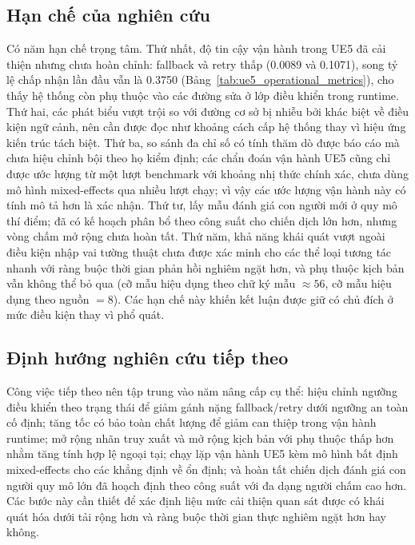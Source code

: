 ﻿\documentclass[a4paper,12pt]{article}
\begin{document}
\subsection{Hạn chế của nghiên cứu}
Có năm hạn chế trọng tâm. Thứ nhất, độ tin cậy vận hành trong UE5 đã cải thiện nhưng chưa hoàn chỉnh: fallback và retry thấp (0.0089 và 0.1071), song tỷ lệ chấp nhận lần đầu vẫn là 0.3750 (Bảng~\ref{tab:ue5_operational_metrics}), cho thấy hệ thống còn phụ thuộc vào các đường sửa ở lớp điều khiển trong runtime. Thứ hai, các phát biểu vượt trội so với đường cơ sở bị nhiễu bởi khác biệt về điều kiện ngữ cảnh, nên cần được đọc như khoảng cách cấp hệ thống thay vì hiệu ứng kiến trúc tách biệt. Thứ ba, so sánh đa chỉ số có tính thăm dò được báo cáo mà chưa hiệu chỉnh bội theo họ kiểm định; các chẩn đoán vận hành UE5 cũng chỉ được ước lượng từ một lượt benchmark với khoảng nhị thức chính xác, chưa dùng mô hình mixed-effects qua nhiều lượt chạy; vì vậy các ước lượng vận hành này có tính mô tả hơn là xác nhận. Thứ tư, lấy mẫu đánh giá con người mới ở quy mô thí điểm; đã có kế hoạch phân bổ theo công suất cho chiến dịch lớn hơn, nhưng vòng chấm mở rộng chưa hoàn tất. Thứ năm, khả năng khái quát vượt ngoài điều kiện nhập vai tường thuật chưa được xác minh cho các thể loại tương tác nhanh với ràng buộc thời gian phản hồi nghiêm ngặt hơn, và phụ thuộc kịch bản vẫn không thể bỏ qua (cỡ mẫu hiệu dụng theo chữ ký mẫu \(\approx 56\), cỡ mẫu hiệu dụng theo nguồn \(=8\)). Các hạn chế này khiến kết luận được giữ có chủ đích ở mức điều kiện thay vì phổ quát.

\subsection{Định hướng nghiên cứu tiếp theo}
Công việc tiếp theo nên tập trung vào năm nâng cấp cụ thể: hiệu chỉnh ngưỡng điều khiển theo trạng thái để giảm gánh nặng fallback/retry dưới ngưỡng an toàn cố định; tăng tốc có bảo toàn chất lượng để giảm can thiệp trong vận hành runtime; mở rộng nhãn truy xuất và mở rộng kịch bản với phụ thuộc thấp hơn nhằm tăng tính hợp lệ ngoại tại; chạy lặp vận hành UE5 kèm mô hình bất định mixed-effects cho các khẳng định về ổn định; và hoàn tất chiến dịch đánh giá con người quy mô lớn đã hoạch định theo công suất với đa dạng người chấm cao hơn. Các bước này cần thiết để xác định liệu mức cải thiện quan sát được có khái quát hóa dưới tải rộng hơn và ràng buộc thời gian thực nghiêm ngặt hơn hay không.
\end{document}
